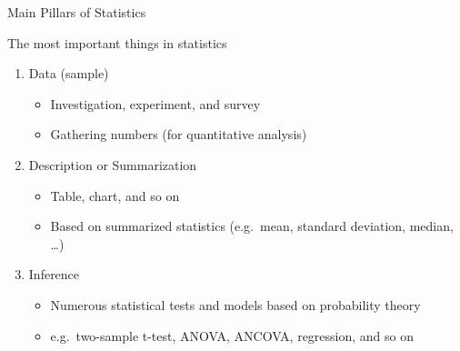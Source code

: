 \documentclass[9pt,ignorenonframetext,xcolor=dvipsnames]{beamer}
\providecommand{\tightlist}{%
  \setlength{\itemsep}{0pt}\setlength{\parskip}{0pt}}
\newlength{\wideitemsep}
\let\olditem\item
\renewcommand{\item}{\setlength{\itemsep}{\wideitemsep}\olditem}
\begin{document}
\begin{frame}{Main Pillars of Statistics}

\LARGE

\begin{block}{The most important things in statistics}

\normalsize

\begin{enumerate}
\def\labelenumi{\arabic{enumi}.}
\tightlist
\item
  Data (sample)

  \begin{itemize}
  \tightlist
  \item
    Investigation, experiment, and survey
  \item
    Gathering numbers (for quantitative analysis)
  \end{itemize}
\item
  Description or Summarization

  \begin{itemize}
  \tightlist
  \item
    Table, chart, and so on
  \item
    Based on summarized statistics (e.g.~mean, standard deviation,
    median, \ldots{})
  \end{itemize}
\item
  Inference

  \begin{itemize}
  \tightlist
  \item
    Numerous statistical tests and models based on probability theory
  \item
    e.g.~two-sample t-test, ANOVA, ANCOVA, regression, and so on
  \end{itemize}
\end{enumerate}

\end{block}

\end{frame}
\end{document}
